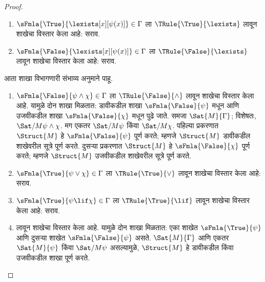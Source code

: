 \begin{proof}
\begin{enumerate}
  \ref{fol:syn:ass:prop:sat-quant} नुसार,
  $\Sat/{M}{\lforall[x][\varphi(x)]}$ तेव्हा आणि केवळ तेव्हाच, जेव्हा काही $s$
  साठी $\Sat/{M}{\varphi(x)}[s]$. आता $\Struct{M'}$ ही $\Struct{M}$ सारखीच
  असू द्या, फक्त $\Assign{a}{M'} = s(x)$. $a$ हे $\Gamma$ मध्ये येत
  नसल्यामुळे, \ref{fol:syn:ext:cor:extensionality-sent} नुसार कोणत्याही
  $\sFmla{\True}{\chi} \in \Gamma$ साठी $\Sat{M'}{\chi}$, आणि कोणत्याही
  $\sFmla{\False}{\chi} \in \Gamma$ साठी $\Sat/{M'}{\chi}$.

  \ref{fol:syn:ext:prop:extensionality} नुसार $\Sat/{M'}{\varphi(x)}[s]$.
  \ref{fol:syn:ext:prop:ext-formulas} नुसार $\Sat/{M'}{\varphi(a)}[s]$.
  $\varphi(a)$ हे वाक्य असल्यामुळे,
  \ref{fol:syn:ass:prop:sentence-sat-true} नुसार $\Sat/{M'}{\varphi(a)}$;
  म्हणजे $\Struct{M'}$ हे $\sFmla{\False}{\varphi(a)}$ पूर्ण करते.
\item $\sFmla{\True}{\lexists[x][\psi(x)]} \in \Gamma$ ला
  $\TRule{\True}{\lexists}$ लावून शाखेचा विस्तार केला आहे: सराव.
\item $\sFmla{\False}{\lexists[x][\psi(x)]} \in \Gamma$ ला
  $\TRule{\False}{\lexists}$ लावून शाखेचा विस्तार केला आहे: सराव.
\end{enumerate}
आता शाखा विभागणारी संभाव्य अनुमाने पाहू.
\begin{enumerate}
\item $\sFmla{\False}{\psi \land \chi} \in \Gamma$ ला
  $\TRule{\False}{\land}$ लावून शाखेचा विस्तार केला आहे. यामुळे दोन शाखा
  मिळतात: डावीकडील शाखा $\sFmla{\False}{\psi}$ मधून आणि उजवीकडील शाखा
  $\sFmla{\False}{\chi}$ मधून पुढे जाते. समजा
  $\Sat{M}{\Gamma}$; विशेषतः,
  $\Sat/{M}{\psi \land \chi}$. मग एकतर
  $\Sat/{M}{\psi}$ किंवा
  $\Sat/{M}{\chi}$. पहिल्या प्रकरणात
  $\Struct{M}$ हे
  $\sFmla{\False}{\psi}$ पूर्ण करते; म्हणजे
  $\Struct{M}$ डावीकडील शाखेवरील सूत्रे पूर्ण करते.
  दुसऱ्या प्रकरणात $\Struct{M}$ हे
  $\sFmla{\False}{\chi}$ पूर्ण करते; म्हणजे
  $\Struct{M}$ उजवीकडील शाखेवरील सूत्रे पूर्ण करते.
\item $\sFmla{\True}{\psi \lor \chi} \in \Gamma$ ला
  $\TRule{\True}{\lor}$ लावून शाखेचा विस्तार केला आहे: सराव.
\item $\sFmla{\True}{\psi \lif \chi} \in \Gamma$ ला
  $\TRule{\True}{\lif}$ लावून शाखेचा विस्तार केला आहे: सराव.
\item \Cut{} लावून शाखेचा विस्तार केला आहे. यामुळे दोन शाखा मिळतात: एका
  शाखेत $\sFmla{\True}{\psi}$ आणि दुसऱ्या शाखेत $\sFmla{\False}{\psi}$ असते.
  $\Sat{M}{\Gamma}$ आणि एकतर
  $\Sat{M}{\psi}$ किंवा
  $\Sat/{M}{\psi}$ असल्यामुळे,
  $\Struct{M}$ हे डावीकडील किंवा उजवीकडील शाखा
  पूर्ण करते.
\end{enumerate}
\end{proof}


